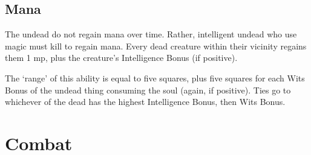 \begin{multicols}{2}
\subsection{Mana}

The undead do not regain mana over time.
Rather, intelligent undead who use magic must kill to regain mana.
Every dead creature within their vicinity regains them 1 \gls{mp}, plus the creature's Intelligence Bonus (if positive).

The `range' of this ability is equal to five squares, plus five squares for each Wits Bonus of the undead thing consuming the soul (again, if positive).
Ties go to whichever of the dead has the highest Intelligence Bonus, then Wits Bonus.

\end{multicols}

\section{Combat}

